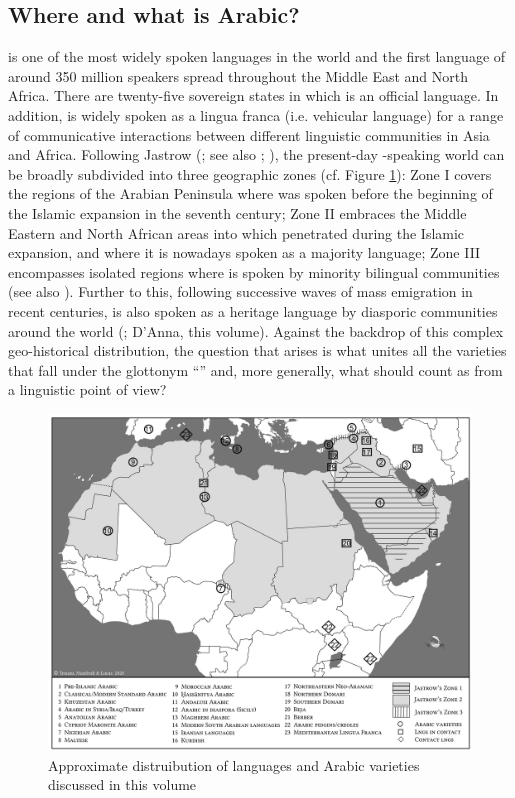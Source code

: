 \documentclass[output=paper]{langsci/langscibook}
\begin{document}
\subsection{Where and what is Arabic?}\label{introwherewhat}

 is one of the most widely spoken languages in the world and the first language of around 350 million speakers spread throughout the Middle East and North Africa. There are twenty-five sovereign states in which  is an official language. In addition,  is widely spoken as a lingua franca (i.e. vehicular language) for a range of communicative interactions between different linguistic communities in Asia and Africa. Following Jastrow (\citeyear{Jastrow2002}; see also \citealt{Watson2011dialectsoverview}; \citealt{Manfrediforthcoming}), the present-day -speaking world can be broadly subdivided into three geographic zones (cf. Figure \ref{intromap}): Zone I covers the regions of the Arabian Peninsula where  was spoken before the beginning of the Islamic expansion in the seventh century; Zone II embraces the Middle Eastern and North African areas into which  penetrated during the Islamic expansion, and where it is nowadays spoken as a majority language; Zone III encompasses isolated regions where  is spoken by minority bilingual communities (see also \citealt{Owens2000editor}). Further to this, following successive waves of mass emigration in recent centuries,  is also spoken as a heritage language by diasporic communities around the world (\citealt{Rouchdy_arabic_1992,BoumansdeRuiter2002}; D’Anna, this volume). Against the backdrop of this complex geo-historical distribution, the question that arises is what unites all the varieties that fall under the glottonym ``'' and, more generally, what should count as  from a linguistic point of view?

\begin{figure}
\includegraphics[width=\textwidth]{figures/intromap.jpg}
\caption{Approximate distruibution of languages and Arabic varieties discussed in this volume}
\label{intromap}
\end{figure}
\end{document}
